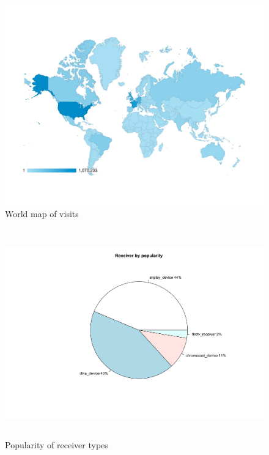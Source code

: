 \begin{figure}[htb]
\centering \includegraphics[width=14cm]{charts/session_world_map}
\caption{World map of visits \label{user_map}}
\end{figure}

\begin{figure}[htb]
\centering \includegraphics[height=9cm]{charts/receiver_popularity}
\caption{Popularity of receiver types \label{receiver_types}}
\end{figure}

